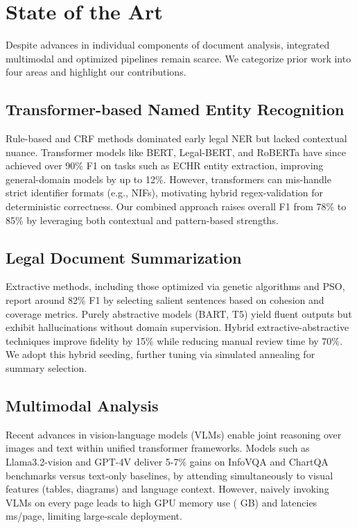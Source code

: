 \documentclass[conference]{IEEEtran}
\begin{document}
\section{State of the Art}
Despite advances in individual components of document analysis, integrated multimodal and optimized pipelines remain scarce. We categorize prior work into four areas and highlight our contributions.

\subsection{Transformer-based Named Entity Recognition}
Rule-based and CRF methods dominated early legal NER but lacked contextual nuance. Transformer models like BERT, Legal-BERT, and RoBERTa have since achieved over 90\% F1 on tasks such as ECHR entity extraction, improving general-domain models by up to 12\%. However, transformers can mis-handle strict identifier formats (e.g., NIFs), motivating hybrid regex-validation for deterministic correctness. Our combined approach raises overall F1 from 78\% to 85\% by leveraging both contextual and pattern-based strengths.

\subsection{Legal Document Summarization}
Extractive methods, including those optimized via genetic algorithms and PSO, report around 82\% F1 by selecting salient sentences based on cohesion and coverage metrics. Purely abstractive models (BART, T5) yield fluent outputs but exhibit hallucinations without domain supervision. Hybrid extractive-abstractive techniques improve fidelity by 15\% while reducing manual review time by 70\%. We adopt this hybrid seeding, further tuning via simulated annealing for summary selection.

\subsection{Multimodal Analysis}
Recent advances in vision-language models (VLMs) enable joint reasoning over images and text within unified transformer frameworks. Models such as Llama3.2-vision and GPT-4V deliver 5-7\% gains on InfoVQA and ChartQA benchmarks versus text-only baselines, by attending simultaneously to visual features (tables, diagrams) and language context. However, naively invoking VLMs on every page leads to high GPU memory use ( GB) and latencies  ms/page, limiting large-scale deployment.
\end{document}
